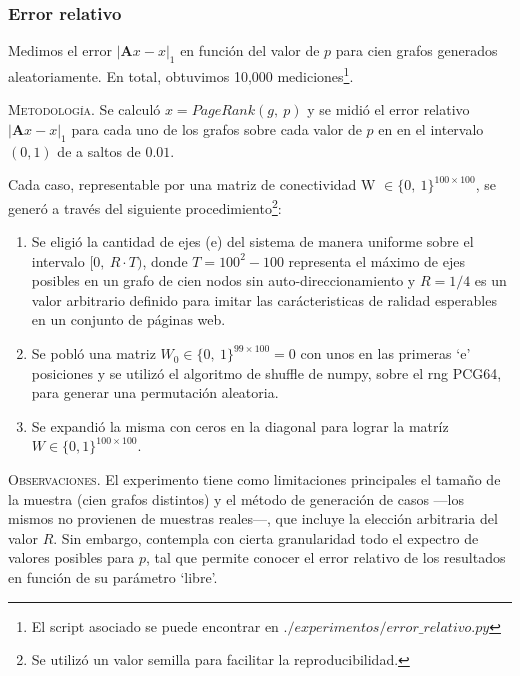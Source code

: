 \vspace{2em}
\subsubsection{Error relativo} Medimos el error $|\mathbf{A}x - x|_1$ en función del valor de $p$ para cien grafos generados aleatoriamente. En total, obtuvimos 10,000 mediciones\footnote{El script asociado se puede encontrar en $./experimentos/error\_relativo.py$}.  
\vspace{1em}

\noindent \textsc{Metodología}. Se calculó  $x = PageRank(g,\ p)$ y se midió el error relativo $|\mathbf{A}x - x|_1$ para cada uno de los grafos sobre cada valor de $p$ en en el intervalo $(0, 1)$ de a saltos de $0.01$.
\vspace{1em}

\noindent Cada caso, representable por una matriz de conectividad W $\in \{0,\ 1\}^{100 \times 100}$, se generó a través del siguiente procedimiento\footnote{Se utilizó un valor semilla para facilitar la reproducibilidad.}:
\vspace{1em}

\begin{enumerate}
    \item Se eligió  la cantidad de ejes (e) del sistema de manera uniforme sobre el intervalo $[0,\ R \cdot T)$, donde $T = 100^2 - 100$ representa el máximo de ejes posibles en un grafo de cien nodos sin auto-direccionamiento y $R = 1/4$ es un valor arbitrario definido para imitar las carácteristicas de ralidad esperables en un conjunto de páginas web.
    \item Se pobló una matriz $W_0 \in \{0,\ 1\}^{99 \times 100} = 0$ con unos en las primeras `e' posiciones y se utilizó el algoritmo de shuffle de numpy, sobre el rng \textsc{PCG64}, para generar una permutación aleatoria.
    \item Se expandió la misma con ceros en la diagonal para lograr la matríz $W \in \{0, 1\}^{100 \times 100}$. 
\end{enumerate}
\vspace{1em}


\noindent \textsc{Observaciones}. El experimento tiene como limitaciones principales el tamaño de la muestra (cien grafos distintos) y el método de generación de casos ---los mismos no provienen de muestras reales---, que incluye la elección arbitraria del valor $R$. Sin embargo, contempla con cierta granularidad todo el expectro de valores posibles para $p$, tal que permite conocer el error relativo de los resultados en función de su parámetro `libre'.
\vspace{1em}


